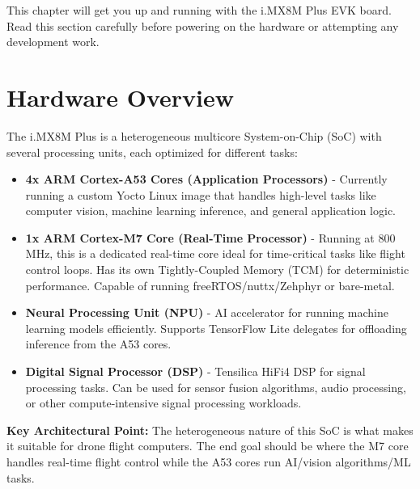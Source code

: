 \documentclass[12pt,a4paper]{report}
\begin{document}
This chapter will get you up and running with the i.MX8M Plus EVK board. Read this section carefully before powering on the hardware or attempting any development work.

\section{Hardware Overview}

The i.MX8M Plus is a heterogeneous multicore System-on-Chip (SoC) with several processing units, each optimized for different tasks:

\begin{itemize}
    \item \textbf{4x ARM Cortex-A53 Cores (Application Processors)} - Currently running a custom Yocto Linux image that handles high-level tasks like computer vision, machine learning inference, and general application logic.
    
    \item \textbf{1x ARM Cortex-M7 Core (Real-Time Processor)} - Running at 800 MHz, this is a dedicated real-time core ideal for time-critical tasks like flight control loops. Has its own Tightly-Coupled Memory (TCM) for deterministic performance. Capable of running freeRTOS/nuttx/Zehphyr or bare-metal.
    
    \item \textbf{Neural Processing Unit (NPU)} - AI accelerator for running machine learning models efficiently. Supports TensorFlow Lite delegates for offloading inference from the A53 cores.
    
    \item \textbf{Digital Signal Processor (DSP)} - Tensilica HiFi4 DSP for signal processing tasks. Can be used for sensor fusion algorithms, audio processing, or other compute-intensive signal processing workloads.
    
\end{itemize}

\begin{important}
\textbf{Key Architectural Point:} The heterogeneous nature of this SoC is what makes it suitable for drone flight computers. The end goal should be where the M7 core handles real-time flight control while the A53 cores run AI/vision algorithms/ML tasks.
\end{important}
\end{document}

